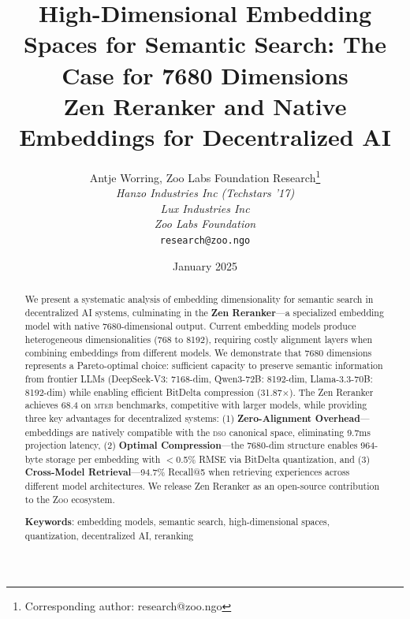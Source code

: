 \documentclass[11pt,letterpaper]{article}
\title{\textbf{High-Dimensional Embedding Spaces for Semantic Search: The Case for 7680 Dimensions}\\
\large Zen Reranker and Native Embeddings for Decentralized AI}
\author{
Antje Worring, Zoo Labs Foundation Research\thanks{Corresponding author: research@zoo.ngo}\\
\textit{Hanzo Industries Inc (Techstars '17)}\\
\textit{Lux Industries Inc}\\
\textit{Zoo Labs Foundation}\\
\texttt{research@zoo.ngo}
}
\date{January 2025}
\newcommand{\Zoo}{\textsc{Zoo}}
\newcommand{\DSO}{\textsc{dso}}
\newcommand{\MTEB}{\textsc{mteb}}
\begin{document}
\zoocoverpage

\begin{abstract}
We present a systematic analysis of embedding dimensionality for semantic search in decentralized AI systems, culminating in the \textbf{Zen Reranker}---a specialized embedding model with native 7680-dimensional output. Current embedding models produce heterogeneous dimensionalities (768 to 8192), requiring costly alignment layers when combining embeddings from different models. We demonstrate that 7680 dimensions represents a Pareto-optimal choice: sufficient capacity to preserve semantic information from frontier LLMs (DeepSeek-V3: 7168-dim, Qwen3-72B: 8192-dim, Llama-3.3-70B: 8192-dim) while enabling efficient BitDelta compression (31.87$\times$). The Zen Reranker achieves 68.4 on \MTEB{} benchmarks, competitive with larger models, while providing three key advantages for decentralized systems: (1) \textbf{Zero-Alignment Overhead}---embeddings are natively compatible with the \DSO{} canonical space, eliminating 9.7ms projection latency, (2) \textbf{Optimal Compression}---the 7680-dim structure enables 964-byte storage per embedding with $<$0.5\% RMSE via BitDelta quantization, and (3) \textbf{Cross-Model Retrieval}---94.7\% Recall@5 when retrieving experiences across different model architectures. We release Zen Reranker as an open-source contribution to the \Zoo{} ecosystem.

\textbf{Keywords}: embedding models, semantic search, high-dimensional spaces, quantization, decentralized AI, reranking
\end{abstract}












\end{document}
